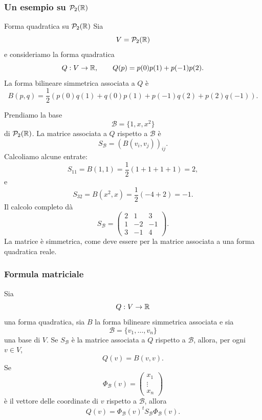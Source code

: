 \documentclass[a4paper]{article}
\begin{document}
\subsubsection{Un esempio su \(\mathcal{P}_2(\mathbb{R})\)}

\begin{snippetexample}{Forma quadratica su \(\mathcal{P}_2(\mathbb{R})\)}
    Sia
    \[
        V=\mathcal{P}_2(\mathbb{R})
    \]
    e consideriamo la forma quadratica
    \[
        Q:V\to\mathbb{R},
        \qquad
        Q(p)=p(0)p(1)+p(-1)p(2).
    \]
    La forma bilineare simmetrica associata a \(Q\) è
    \[
        B(p,q)
        =
        \frac{1}{2}
        \left(
            p(0)q(1)+q(0)p(1)+p(-1)q(2)+p(2)q(-1)
        \right).
    \]

    Prendiamo la base
    \[
        \mathcal{B}=\{1,x,x^2\}
    \]
    di \(\mathcal{P}_2(\mathbb{R})\). La matrice associata a \(Q\) rispetto a \(\mathcal{B}\) è
    \[
        S_{\mathcal{B}}=(B(v_i,v_j))_{ij}.
    \]
    Calcoliamo alcune entrate:
    \[
        S_{11}=B(1,1)
        =
        \frac{1}{2}(1+1+1+1)=2,
    \]
    e
    \[
        S_{32}=B(x^2,x)
        =
        \frac{1}{2}(-4+2)=-1.
    \]
    Il calcolo completo dà
    \[
        S_{\mathcal{B}}
        =
        \begin{pmatrix}
            2 & 1 & 3\\
            1 & -2 & -1\\
            3 & -1 & 4
        \end{pmatrix}.
    \]
    La matrice è simmetrica, come deve essere per la matrice associata a una forma quadratica reale.
\end{snippetexample}

\subsubsection{Formula matriciale}

Sia
\[
    Q:V\to\mathbb{R}
\]
una forma quadratica, sia \(B\) la forma bilineare simmetrica associata e sia
\[
    \mathcal{B}=\{v_1,\ldots,v_n\}
\]
una base di \(V\). Se \(S_{\mathcal{B}}\) è la matrice associata a \(Q\) rispetto a \(\mathcal{B}\), allora, per ogni \(v\in V\),
\[
    Q(v)=B(v,v).
\]
Se
\[
    \Phi_{\mathcal{B}}(v)
    =
    \begin{pmatrix}
        x_1\\
        \vdots\\
        x_n
    \end{pmatrix}
\]
è il vettore delle coordinate di \(v\) rispetto a \(\mathcal{B}\), allora
\[
    Q(v)
    =
    \Phi_{\mathcal{B}}(v)^t
    S_{\mathcal{B}}
    \Phi_{\mathcal{B}}(v).
\]
\end{document}

